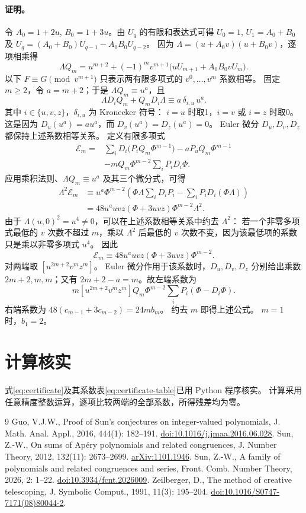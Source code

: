 \documentclass[a4paper,11pt]{article}
\numberwithin{equation}{section}
\theoremstyle{chinese}
\begin{document}
\paragraph{证明。}
令 $A_0=1+2u$, $B_0=1+3u$。由 $U_q$ 的有限和表达式可得
$U_0=1$, $U_1=A_0+B_0$ 及
$U_q=(A_0+B_0)U_{q-1}-A_0B_0U_{q-2}$。
因为 $\Lambda=(u+A_0v)(u+B_0v)$，逐项相乘得
\[
 \Lambda Q_m=u^{m+2}+(-1)^mv^{m+1}
       \bigl(uU_{m+1}+A_0B_0vU_m\bigr).
\]
以下 $F\equiv G\pmod{v^{m+1}}$ 只表示两有限多项式的
$v^0,\ldots,v^m$ 系数相等。
固定 $m\ge2$，令 $a=m+2$；于是 $\Lambda Q_m\equiv u^a$，且
\[
 \Lambda D_iQ_m+Q_mD_i\Lambda\equiv a\,\delta_{i,u}\,u^a.
\]
其中 $i\in\{u,v,z\}$，$\delta_{i,u}$ 为 Kronecker 符号：
$i=u$ 时取1，$i=v$ 或 $i=z$ 时取0。
这是因为 $D_u(u^a)=au^a$，而 $D_v(u^a)=D_z(u^a)=0$。
Euler 微分 $D_u,D_v,D_z$ 都保持上述系数相等关系。
定义有限多项式
\[
\begin{split}
\mathcal E_m={}&\sum_iD_i\bigl(P_iQ_m\Phi^{m-1}\bigr)
  -aP_uQ_m\Phi^{m-1}\\
 &-mQ_m\Phi^{m-2}\sum_iP_iD_i\Phi.
\end{split}
\]
应用乘积法则、$\Lambda Q_m\equiv u^a$ 及其三个微分式，可得
\[
\begin{split}
\Lambda^2\mathcal E_m
&\equiv u^a\Phi^{m-2}
 \left(\Phi \Lambda\sum_iD_iP_i-\sum_iP_iD_i(\Phi \Lambda)\right)\\
&=48u^auvz(\Phi+3uvz)\Phi^{m-2}\Lambda^2.
\end{split}
\]
由于 $\Lambda(u,0)^2=u^4\ne0$，可以在上述系数相等关系中约去 $\Lambda^2$：
若一个非零多项式最低的 $v$ 次数不超过 $m$，乘以 $\Lambda^2$ 后最低的
$v$ 次数不变，因为该最低项的系数只是乘以非零多项式 $u^4$。
因此
\[
\mathcal E_m\equiv48u^auvz(\Phi+3uvz)\Phi^{m-2}.
\]
对两端取 $[u^{2m+2}v^mz^m]$。
Euler 微分作用于该系数时，$D_u,D_v,D_z$ 分别给出乘数
$2m+2,m,m$；又有 $2m+2-a=m$。故左端系数为
\[
m[u^{2m+2}v^mz^m]Q_m\Phi^{m-2}
 \sum_iP_i(\Phi-D_i\Phi).
\]
右端系数为
$48(c_{m-1}+3c_{m-2})=24m b_m$。
约去 $m$ 即得上述公式。
$m=1$ 时，$b_1=2$。

\section{计算核实}\label{app:reproducibility}
式\eqref{eq:certificate}及其系数表\eqref{eq:certificate-table}已用 Python 程序核实。
计算采用任意精度整数运算，逐项比较两端的全部系数，所得残差均为零。

\begin{thebibliography}{9}
Guo, V.J.W., Proof of Sun's conjectures on integer-valued polynomials,
J. Math. Anal. Appl., 2016, 444(1): 182--191.
\href{https://doi.org/10.1016/j.jmaa.2016.06.028}{doi:10.1016/j.jmaa.2016.06.028}.
Sun, Z.-W., On sums of Ap\'ery polynomials and related congruences,
J. Number Theory, 2012, 132(11): 2673--2699.
\href{https://arxiv.org/abs/1101.1946}{arXiv:1101.1946}.
Sun, Z.-W., A family of polynomials and related congruences and series,
Front. Comb. Number Theory, 2026, 2: 1--22.
\href{https://doi.org/10.3934/fcnt.2026009}{doi:10.3934/fcnt.2026009}.
Zeilberger, D., The method of creative telescoping,
J. Symbolic Comput., 1991, 11(3): 195--204.
\href{https://doi.org/10.1016/S0747-7171(08)80044-2}{doi:10.1016/S0747-7171(08)80044-2}.
\end{thebibliography}
\end{document}
